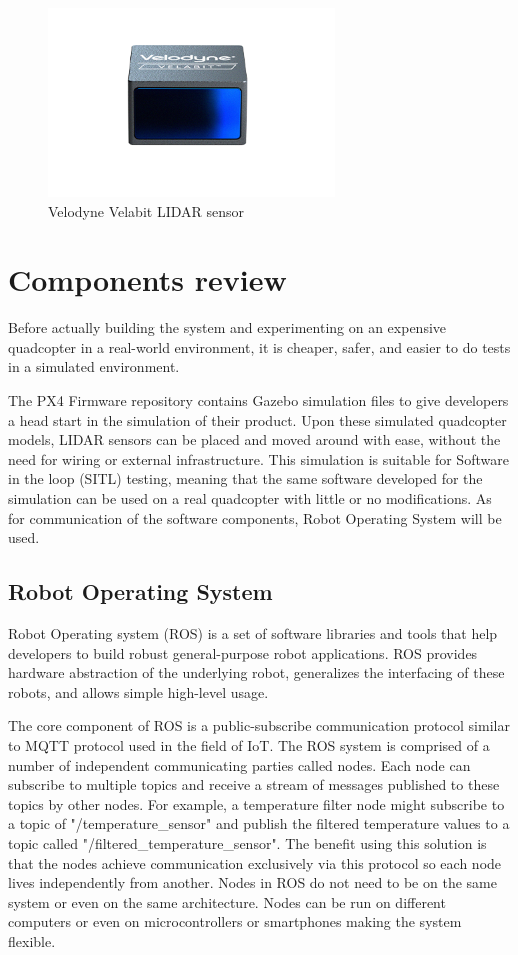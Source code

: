 \begin{figure}[!h]
    \centering
    \includegraphics[height=50mm, keepaspectratio]{figures/velabit.png}
    \caption{Velodyne Velabit LIDAR sensor\cite{VelodyneWebsite}}
    \label{fig:velabit}
\end{figure}



\section{Components review} \label{chap:components}
Before actually building the system and experimenting on an expensive quadcopter in a real-world environment,
it is cheaper, safer, and easier to do tests in a simulated environment. 

The PX4 Firmware repository\cite{PX4Repository} contains Gazebo simulation files to give developers a head 
start in the simulation of their product. Upon these simulated quadcopter models, LIDAR sensors can be placed and 
moved around with ease, without the need for wiring or external infrastructure. This simulation is 
suitable for Software in the loop (SITL) testing, meaning that the same software developed for the simulation
can be used on a real quadcopter with little or no modifications. As for communication of the software 
components, Robot Operating System will be used.


\subsection{Robot Operating System}
Robot Operating system (ROS) is a set of software libraries and tools that help developers to build robust 
general-purpose robot applications\cite{ROSWebsite}. ROS provides hardware abstraction of the underlying 
robot, generalizes the interfacing of these robots, and allows simple high-level usage.


The core component of ROS is a public-subscribe communication protocol similar to MQTT protocol
used in the field of IoT. The ROS system is comprised of a number of independent communicating parties called 
nodes. Each node can subscribe to multiple topics and receive a stream of messages published to these topics 
by other nodes. For example, a temperature filter node might subscribe to a topic of "/temperature\_sensor" 
and publish the filtered temperature values to a topic called "/filtered\_temperature\_sensor". 
The benefit using this solution is that the nodes achieve communication exclusively via this protocol 
so each node lives independently from another. Nodes in ROS do not need to be on the same system or 
even on the same architecture. Nodes can be run on different computers or even on microcontrollers or 
smartphones making the system flexible.

